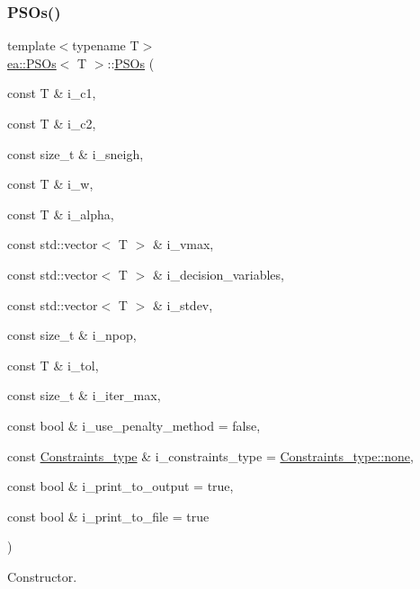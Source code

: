 \subsubsection{\texorpdfstring{P\+S\+Os()}{PSOs()}}
{\footnotesize\ttfamily template$<$typename T$>$ \\
\hyperlink{structea_1_1_p_s_os}{ea\+::\+P\+S\+Os}$<$ T $>$\+::\hyperlink{structea_1_1_p_s_os}{P\+S\+Os} (\begin{DoxyParamCaption}\item[{const T \&}]{i\+\_\+c1,  }\item[{const T \&}]{i\+\_\+c2,  }\item[{const size\+\_\+t \&}]{i\+\_\+sneigh,  }\item[{const T \&}]{i\+\_\+w,  }\item[{const T \&}]{i\+\_\+alpha,  }\item[{const std\+::vector$<$ T $>$ \&}]{i\+\_\+vmax,  }\item[{const std\+::vector$<$ T $>$ \&}]{i\+\_\+decision\+\_\+variables,  }\item[{const std\+::vector$<$ T $>$ \&}]{i\+\_\+stdev,  }\item[{const size\+\_\+t \&}]{i\+\_\+npop,  }\item[{const T \&}]{i\+\_\+tol,  }\item[{const size\+\_\+t \&}]{i\+\_\+iter\+\_\+max,  }\item[{const bool \&}]{i\+\_\+use\+\_\+penalty\+\_\+method = {\ttfamily false},  }\item[{const \hyperlink{namespaceutilities_ab1a1517bf6e62a1acfab5293ca8985c1}{Constraints\+\_\+type} \&}]{i\+\_\+constraints\+\_\+type = {\ttfamily \hyperlink{namespaceea_a8e369877773b4db67b8512efdb4f8f89a334c4a4c42fdb79d7ebc3e73b517e6f8}{Constraints\+\_\+type\+::none}},  }\item[{const bool \&}]{i\+\_\+print\+\_\+to\+\_\+output = {\ttfamily true},  }\item[{const bool \&}]{i\+\_\+print\+\_\+to\+\_\+file = {\ttfamily true} }\end{DoxyParamCaption})\hspace{0.3cm}{\ttfamily [inline]}}



Constructor. 


